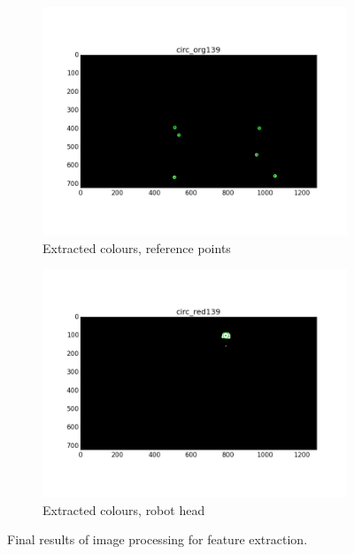 \begin{figure}[htb]
	\begin{subfigure}[b]{0.49\linewidth}
        \centering
		\includegraphics[width=\linewidth]{files/_circ_org139.png}
		\caption{Extracted colours, reference points}
		\label{fig:circ_org}
	\end{subfigure}
	\begin{subfigure}[b]{0.49\linewidth}
        \centering
		\includegraphics[width=\linewidth]{files/_circ_red139.png}
		\caption{Extracted colours, robot head}
		\label{fig:circ_red}
	\end{subfigure}
	\caption{Final results of image processing for feature extraction.} 
\end{figure}


